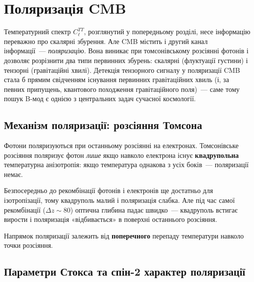 
\chapter{Поляризація CMB}
\label{sec:pol}

Температурний спектр $C_\ell^{TT}$, розглянутий у попередньому
розділі, несе інформацію переважно про скалярні збурення.
Але CMB містить і другий канал інформації~--- \emph{поляризацію}.
Вона виникає при томсонівському розсіянні фотонів і дозволяє
розрізнити два типи первинних збурень: скалярні (флуктуації
густини) і тензорні (гравітаційні хвилі). Детекція тензорного
сигналу у поляризації CMB стала б прямим свідченням існування
первинних гравітаційних хвиль (і, за певних припущень, квантового
походження гравітаційного поля)~--- саме тому пошук B-мод є
однією з центральних задач сучасної космології.

\section{Механізм поляризації: розсіяння Томсона}

Фотони поляризуються при останньому розсіянні на електронах.
Томсонівське розсіяння поляризує фотон \emph{лише} якщо навколо електрона
існує \textbf{квадрупольна} температурна анізотропія: якщо температура
однакова з усіх боків~--- поляризації немає.

Безпосередньо до рекомбінації фотонів і електронів ще достатньо для
ізотропізації, тому квадруполь малий і поляризація слабка.
Але під час самої рекомбінації ($\Delta z \sim 80$) оптична глибина
падає швидко~--- квадруполь встигає вирости і поляризація «відбивається»
в поверхні останнього розсіяння.

Напрямок поляризації залежить від \textbf{поперечного} перепаду температури
навколо точки розсіяння.

\section{Параметри Стокса та спін-2 характер поляризації}
\label{subsec:stokes}

